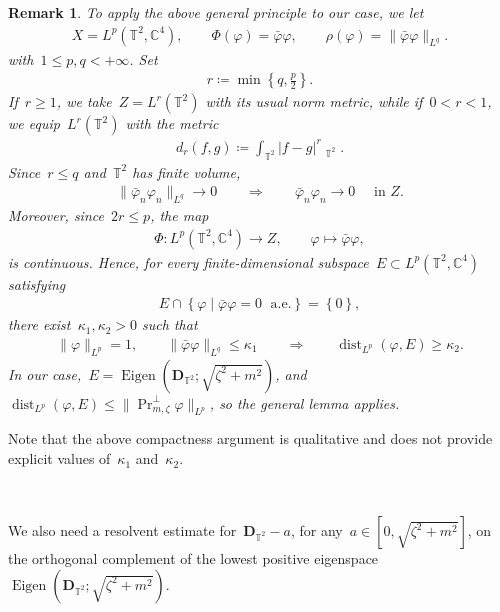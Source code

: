 \documentclass[11pt,final]{amsart}
\newcommand{\C}{\mathbb{C}}
\newcommand{\T}{\mathbb{T}}
\newcommand{\dd}{\mathop{}\!\mathrm{d}}
\newcommand{\pD}{\mathbf{D}}
\newcommand{\braces}[1]{\left\{#1\right\}} %
\DeclareMathOperator{\dist}{dist}
\DeclareMathOperator{\dv}{\dd{vol}}
\DeclareMathOperator{\Eigen}{Eigen}
\DeclareMathOperator{\proj}{Pr}
\newtheorem{rmk}[thm]{Remark}
\begin{document}
\begin{rmk}
    To apply the above general principle to our case, we let
    \begin{align}
        X=L^p(\T^2,\C^4),
        \qquad
        \Phi(\varphi)=\bar{\varphi}\varphi,
        \qquad
        \rho(\varphi)=\|\bar{\varphi}\varphi\|_{L^q}.
    \end{align}
    with~$1\leq p,q<+\infty$. 
    Set
    \begin{align}
        r\coloneqq \min\braces{q,\frac{p}{2}}.
    \end{align}
    If~$r\geq1$, we take~$Z=L^r(\T^2)$ with its usual norm metric, while if~$0<r<1$, we equip~$L^r(\T^2)$ with the metric
    \begin{align}
        d_r(f,g)\coloneqq \int_{\T^2}|f-g|^r\dv_{\T^2}.
    \end{align}
    Since~$r\leq q$ and~$\T^2$ has finite volume,
    \begin{align}
        \|\bar{\varphi}_n\varphi_n\|_{L^q}\to0
        \qquad\Longrightarrow\qquad
        \bar{\varphi}_n\varphi_n\to0
        \quad\mbox{ in }Z.
    \end{align}
    Moreover, since~$2r\leq p$, the map
    \begin{align}
        \Phi\colon L^p(\T^2,\C^4)\to Z,
        \qquad
        \varphi\mapsto\bar{\varphi}\varphi,
    \end{align}
    is continuous.
    Hence, for every finite-dimensional subspace~$E\subset L^p(\T^2,\C^4)$ satisfying
    \begin{align}
        E\cap\braces{\varphi\mid \bar{\varphi}\varphi=0\;\mbox{ a.e.}}=\braces{0},
    \end{align}
    there exist~$\kappa_1,\kappa_2>0$ such that
    \begin{align}
        \|\varphi\|_{L^p}=1,
        \qquad
        \|\bar{\varphi}\varphi\|_{L^q}\leq\kappa_1
        \qquad\Longrightarrow\qquad
        \dist_{L^p}(\varphi,E)\geq\kappa_2.
    \end{align}
    In our case,~$E=\Eigen(\pD_{\T^2};\sqrt{\zeta^2+m^2})$, and~$\dist_{L^p}(\varphi,E)\leq \|\proj_{m,\zeta}^\perp \varphi\|_{L^p}$, so the general lemma applies. 
\end{rmk}
Note that the above compactness argument is qualitative and does not provide explicit values of~$\kappa_1$ and~$\kappa_2$.


\ 

      We also need a resolvent estimate for~$\pD_{\T^2}-a $, for any~$a\in [0,\sqrt{\zeta^2+m^2}]$, on the orthogonal complement of the lowest positive eigenspace~$\Eigen(\pD_{\T^2};\sqrt{\zeta^2+m^2})$.
\end{document}
